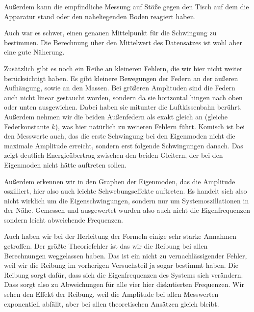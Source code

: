 \documentclass{article}
\begin{document}
                  Außerdem kann die empfindliche Messung auf Stöße gegen den Tisch auf dem die Apparatur stand oder den naheliegenden Boden reagiert haben.

                  Auch war es schwer, einen genauen Mittelpunkt für die Schwingung zu bestimmen. Die Berechnung über den Mittelwert des Datensatzes ist wohl aber eine gute Näherung.

                  Zusätzlich gibt es noch ein Reihe an kleineren Fehlern, die wir hier nicht weiter berücksichtigt haben.
                  Es gibt kleinere Bewegungen der Federn an der äußeren Aufhängung, sowie an den Massen.
                  Bei größeren Amplituden sind die Federn auch nicht linear gestaucht worden, sondern da sie horizontal hingen nach oben oder unten ausgewichen.
                  Dabei haben sie mitunter die Luftkissenbahn berührt.
                  Außerdem nehmen wir die beiden Außenfedern als exakt gleich an (gleiche Federkonstante \(k\)), was hier natürlich zu weiteren Fehlern führt.
                  Komisch ist bei den Messwerte auch, das die erste Schwingung bei den Eigenmoden nicht die maximale Amplitude erreicht, sondern erst folgende Schwingungen danach.
                  Das zeigt deutlich Energieübertrag zwischen den beiden Gleitern, der bei den Eigenmoden nicht hätte auftreten sollen.

                  Außerdem erkennen wir in den Graphen der Eigenmoden, das die Amplitude oszilliert, hier also auch leichte Schwebungseffekte auftreten.
                  Es handelt sich also nicht wirklich um die Eigenschwingungen, sondern nur um Systemoszillationen in der Nähe.
                  Gemessen und ausgewertet wurden also auch nicht die Eigenfrequenzen sondern leicht abweichende Frequenzen.

                  Auch haben wir bei der Herleitung der Formeln einige sehr starke Annahmen getroffen.
                  Der größte Theoriefehler ist das wir die Reibung bei allen Berechnungen weggelassen haben.
                  Das ist ein nicht zu vernachlässigender Fehler, weil wir die Reibung im vorherigen Versuchsteil ja sogar bestimmt haben.
                  Die Reibung sorgt dafür, dass sich die Eigenfrequenzen des Systems sich verändern.
                  Dass sorgt also zu Abweichungen für alle vier hier diskutierten Frequenzen.
                  Wir sehen den Effekt der Reibung, weil die Amplitude bei allen Messwerten exponentiell abfällt,
                  aber bei allen theoretischen Ansätzen gleich bleibt.
\end{document}

